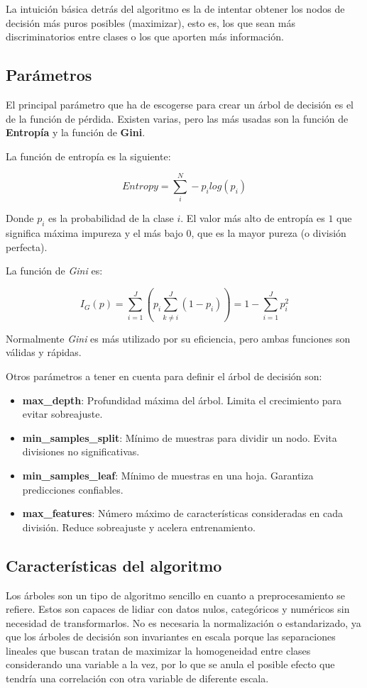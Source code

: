\documentclass[12pt,letterpaper]{article}
\begin{document}
La intuición básica detrás del algoritmo es la de intentar obtener los nodos de decisión más puros posibles (maximizar), esto es, los que sean más discriminatorios entre clases o los que aporten más información.

\subsection{Parámetros}
El principal parámetro que ha de escogerse para crear un árbol de decisión es el de la función de pérdida. Existen varias, pero las más usadas son la función de \textbf{Entropía} y la función de \textbf{Gini}.

La función de entropía es la siguiente:

\begin{equation}
    Entropy=\sum_{i}^{N}-p_{i}log(p_{i})
\end{equation}

Donde $p_i$ es la probabilidad de la clase $i$. El valor más alto de entropía es $1$ que significa máxima impureza y el más bajo $0$, que es la mayor pureza (o división perfecta).

La función de \textit{Gini} es:

\begin{equation}
    I_G(p)=\sum_{i=1}^J(p_i\sum_{k\neq i}^J(1-p_i))=1-\sum_{i=1}^{J}p_{i}^2
\end{equation}

Normalmente \textit{Gini} es más utilizado por su eficiencia, pero ambas funciones son válidas y rápidas.

Otros parámetros a tener en cuenta para definir el árbol de decisión son:

\begin{itemize}
    \item \textbf{max\_depth}: Profundidad máxima del árbol. Limita el crecimiento para evitar sobreajuste.
    \item \textbf{min\_samples\_split}: Mínimo de muestras para dividir un nodo. Evita divisiones no significativas.
    \item \textbf{min\_samples\_leaf}: Mínimo de muestras en una hoja. Garantiza predicciones confiables.
    \item \textbf{max\_features}: Número máximo de características consideradas en cada división. Reduce sobreajuste y acelera entrenamiento.
\end{itemize}

\subsection{Características del algoritmo}
Los árboles son un tipo de algoritmo sencillo en cuanto a preprocesamiento se refiere. Estos son capaces de lidiar con datos nulos, categóricos y numéricos sin necesidad de transformarlos. No es necesaria la normalización o estandarizado, ya que los árboles de decisión son invariantes en escala porque las separaciones lineales que buscan tratan de maximizar la homogeneidad entre clases considerando una variable a la vez, por lo que se anula el posible efecto que tendría una correlación con otra variable de diferente escala.
\end{document}

